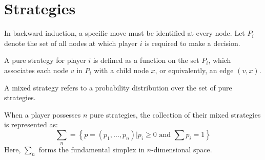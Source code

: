 \section{Strategies}

In backward induction, a specific move must be identified at every node. 
Let $P_i$ denote the set of all nodes at which player $i$ is required to make a decision.
\begin{definition}
    A pure strategy for player $i$ is defined as a function on the set $P_i$, which associates each node $v$ in $P_i$ with a child node $x$, or equivalently, an edge $(v, x)$.
\end{definition}
\begin{definition}
    A mixed strategy refers to a probability distribution over the set of pure strategies.
\end{definition}
When a player possesses $n$ pure strategies, the collection of their mixed strategies is represented as:
\[\sum_n=\left\{p=(p_1,\dots,p_n)|p_i\geq 0 \text{ and }\sum{p_i}=1\right\}\]
Here, $\sum_n$ forms the fundamental simplex in $n$-dimensional space. 

